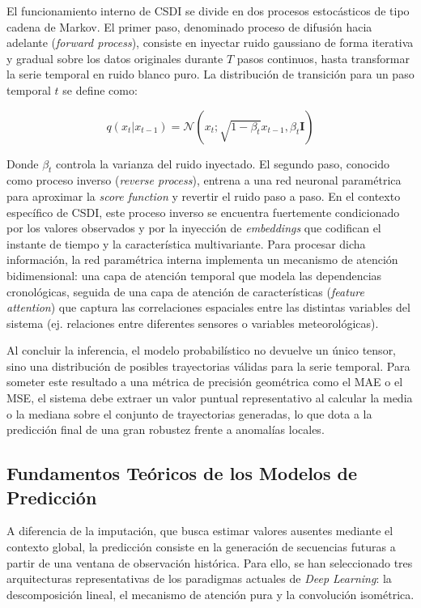 El funcionamiento interno de CSDI se divide en dos procesos estocásticos de tipo cadena de Markov. El primer paso, denominado proceso de difusión hacia adelante (\textit{forward process}), consiste en inyectar ruido gaussiano de forma iterativa y gradual sobre los datos originales durante $T$ pasos continuos, hasta transformar la serie temporal en ruido blanco puro. La distribución de transición para un paso temporal $t$ se define como:

\begin{equation}
	q(x_t | x_{t-1}) = \mathcal{N}(x_t; \sqrt{1 - \beta_t} x_{t-1}, \beta_t \mathbf{I})
\end{equation}

Donde $\beta_t$ controla la varianza del ruido inyectado. El segundo paso, conocido como proceso inverso (\textit{reverse process}), entrena a una red neuronal paramétrica para aproximar la \textit{score function} y revertir el ruido paso a paso. En el contexto específico de CSDI, este proceso inverso se encuentra fuertemente condicionado por los valores observados y por la inyección de \textit{embeddings} que codifican el instante de tiempo y la característica multivariante. Para procesar dicha información, la red paramétrica interna implementa un mecanismo de atención bidimensional: una capa de atención temporal que modela las dependencias cronológicas, seguida de una capa de atención de características (\textit{feature attention}) que captura las correlaciones espaciales entre las distintas variables del sistema (ej. relaciones entre diferentes sensores o variables meteorológicas).

Al concluir la inferencia, el modelo probabilístico no devuelve un único tensor, sino una distribución de posibles trayectorias válidas para la serie temporal. Para someter este resultado a una métrica de precisión geométrica como el MAE o el MSE, el sistema debe extraer un valor puntual representativo al calcular la media o la mediana sobre el conjunto de trayectorias generadas, lo que dota a la predicción final de una gran robustez frente a anomalías locales.



\subsection{Fundamentos Teóricos de los Modelos de Predicción}
\label{sec:theoretical_framework_forecasting}

A diferencia de la imputación, que busca estimar valores ausentes mediante el contexto global, la predicción consiste en la generación de secuencias futuras a partir de una ventana de observación histórica. Para ello, se han seleccionado tres arquitecturas representativas de los paradigmas actuales de \textit{Deep Learning}: la descomposición lineal, el mecanismo de atención pura y la convolución isométrica.

